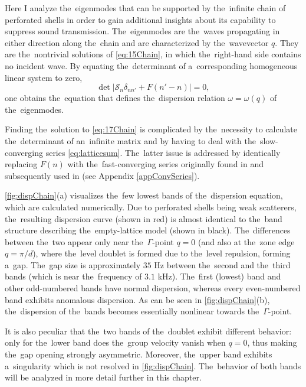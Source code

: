 Here I analyze the~eigenmodes that can be supported by the~infinite chain of perforated shells in order to gain additional insights about its capability to suppress sound transmission.
The~eigenmodes are the~waves propagating in either direction along the~chain and are characterized by the~wavevector $q$.
They are the~nontrivial solutions of \cref{eq:15Chain}, in which the~right-hand side contains no incident wave.
By equating the~determinant of a~corresponding homogeneous linear system to zero,
\begin{equation}
\label{eq:17Chain}
\det |\mathcal{S}_n \delta_{nn'} + F(n'-n)|=0,
\end{equation}
one obtains the~equation that defines the~dispersion relation $\omega=\omega(q)$ of the~eigenmodes.

Finding the~solution to \cref{eq:17Chain} is complicated by the~necessity to calculate the~determinant of an~infinite matrix and by having to deal with the~slow-converging series \cref{eq:latticesum}.
The~latter issue is addressed by identically replacing $F(n)$ with the~fast-converging series originally found in \cite{twersky} and subsequently used in \cite{vergeles, evans} (see Appendix \ref{appConvSeries}).

\cref{fig:dispChain}(a) visualizes the~few lowest bands of the~dispersion equation, which are calculated numerically.
Due to perforated shells being weak scatterers, the~resulting dispersion curve (shown in red) is almost identical to the~band structure describing the~empty-lattice model (shown in black).
The~differences between the~two appear only near the~$\Gamma$-point $q=0$ (and also at the~zone edge $q=\pi/d$), where the~level doublet is formed due to the~level repulsion, forming a~gap.
The~gap size is approximately $35$ Hz between the~second and the~third bands (which is near the~frequency of $3.1$ kHz).
The~first (lowest) band and other odd-numbered bands have normal dispersion, whereas every even-numbered band exhibits anomalous dispersion.
As can be seen in \cref{fig:dispChain}(b), the~dispersion of the~bands becomes essentially nonlinear towards the~$\Gamma$-point.

It is also peculiar that the~two bands of the~doublet exhibit different behavior: only for the~lower band does the~group velocity vanish when $q=0$, thus making the~gap opening strongly asymmetric.
Moreover, the~upper band exhibits a~singularity which is not resolved in \cref{fig:dispChain}.
The~behavior of both bands will be analyzed in more detail further in this chapter.

